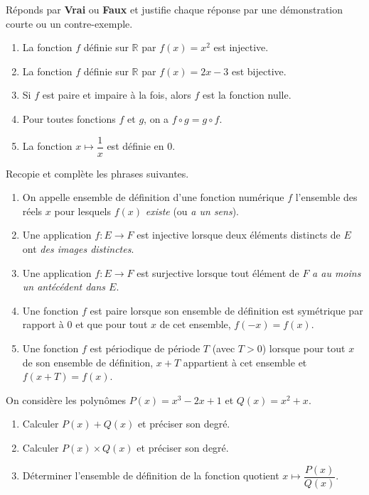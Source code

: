 \documentclass[11pt]{article}
\newcommand{\cle}[1]{{\popxbold\color{popdark}#1}}
\begin{document}
\begin{exercice}
Réponds par \textbf{Vrai} ou \textbf{Faux} et justifie chaque réponse par une démonstration courte ou un contre-exemple.
\begin{enumerate}
\item La fonction $f$ définie sur $\mathbb{R}$ par $f(x)=x^2$ est injective.
\item La fonction $f$ définie sur $\mathbb{R}$ par $f(x)=2x-3$ est bijective.
\item Si $f$ est paire et impaire à la fois, alors $f$ est la fonction nulle.
\item Pour toutes fonctions $f$ et $g$, on a $f\circ g = g\circ f$.
\item La fonction $x\mapsto \dfrac{1}{x}$ est définie en $0$.
\end{enumerate}
\end{exercice}

\begin{exercice}
Recopie et complète les phrases suivantes.
\begin{enumerate}
\item On appelle \cle{ensemble de définition} d'une fonction numérique $f$ l'ensemble des réels $x$ pour lesquels $f(x)$ \emph{existe} (ou \emph{a un sens}).
\item Une application $f:E\to F$ est \cle{injective} lorsque deux éléments distincts de $E$ ont \emph{des images distinctes}.
\item Une application $f:E\to F$ est \cle{surjective} lorsque tout élément de $F$ \emph{a au moins un antécédent dans $E$}.
\item Une fonction $f$ est \cle{paire} lorsque son ensemble de définition est symétrique par rapport à $0$ et que pour tout $x$ de cet ensemble, $f(-x)=f(x)$.
\item Une fonction $f$ est \cle{périodique} de période $T$ (avec $T>0$) lorsque pour tout $x$ de son ensemble de définition, $x+T$ appartient à cet ensemble et $f(x+T)=f(x)$.
\end{enumerate}
\end{exercice}

\begin{exercice}
On considère les polynômes $P(x)=x^3-2x+1$ et $Q(x)=x^2+x$.
\begin{enumerate}
\item Calculer $P(x)+Q(x)$ et préciser son degré.
\item Calculer $P(x)\times Q(x)$ et préciser son degré.
\item Déterminer l'ensemble de définition de la fonction quotient $x \mapsto \dfrac{P(x)}{Q(x)}$.
\end{enumerate}
\end{exercice}
\end{document}
